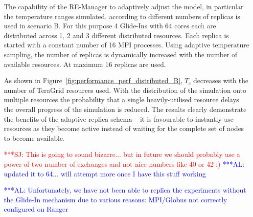 \documentclass{rspublic}
\newcommand{\alnote}[1]{ {\textcolor{blue} { ***AL: #1 }}}
\newcommand{\jhanote}[1]{ {\textcolor{red} { ***SJ: #1 }}}
\newcommand{\alnote}[1]{}
\newcommand{\jhanote}[1]{}
\begin{document}
The capability of the RE-Manager to adaptively adjust the model, in particular
the temperature ranges simulated, according to different numbers of replicas 
is used in scenario B. For this purpose 4 Glide-Ins with 64 cores each are 
distributed across 1, 2 and 3 different distributed resources. Each replica
is started with a constant number of 16 MPI processes. Using adaptive
temperature sampling, the number of replicas is dynamically increased with
the number of available resources. At maximum 16 replicas are used.

As shown in Figure~\ref{fig:performance_perf_distributed_B}, $T_{c}$ 
decreases with the number of TeraGrid resources used. 
With the distribution of the simulation onto multiple resources the probability
that a single heavily-utilised resource delays the overall progress of
the simulation is reduced. 
The results clearly demonstrate the benefits of the
adaptive replica schema -- it is favourable to 
instantly use resources as they become active 
instead of waiting for the complete set of nodes to become
available.


\jhanote{This is going to sound bizarre... but in future we should
  probably use a power-of-two number of exchanges and not nice numbers
  like 40 or 42 :)}           
\alnote{updated it to 64... will attempt more once I have this stuff working}

                                              
\alnote{Unfortunately, we have not been able to replica the
  experiments without the Glide-In mechanism due to various reasons:
  MPI/Globus not correctly configured on Ranger}




\end{document}
